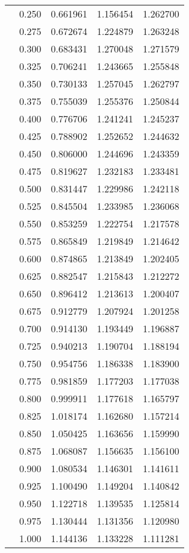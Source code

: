 \begin{tabular}{llrrr}
         & 0.250 &   0.661961 &   1.156454 &   1.262700 \\
         & 0.275 &   0.672674 &   1.224879 &   1.263248 \\
         & 0.300 &   0.683431 &   1.270048 &   1.271579 \\
         & 0.325 &   0.706241 &   1.243665 &   1.255848 \\
         & 0.350 &   0.730133 &   1.257045 &   1.262797 \\
         & 0.375 &   0.755039 &   1.255376 &   1.250844 \\
         & 0.400 &   0.776706 &   1.241241 &   1.245237 \\
         & 0.425 &   0.788902 &   1.252652 &   1.244632 \\
         & 0.450 &   0.806000 &   1.244696 &   1.243359 \\
         & 0.475 &   0.819627 &   1.232183 &   1.233481 \\
         & 0.500 &   0.831447 &   1.229986 &   1.242118 \\
         & 0.525 &   0.845504 &   1.233985 &   1.236068 \\
         & 0.550 &   0.853259 &   1.222754 &   1.217578 \\
         & 0.575 &   0.865849 &   1.219849 &   1.214642 \\
         & 0.600 &   0.874865 &   1.213849 &   1.202405 \\
         & 0.625 &   0.882547 &   1.215843 &   1.212272 \\
         & 0.650 &   0.896412 &   1.213613 &   1.200407 \\
         & 0.675 &   0.912779 &   1.207924 &   1.201258 \\
         & 0.700 &   0.914130 &   1.193449 &   1.196887 \\
         & 0.725 &   0.940213 &   1.190704 &   1.188194 \\
         & 0.750 &   0.954756 &   1.186338 &   1.183900 \\
         & 0.775 &   0.981859 &   1.177203 &   1.177038 \\
         & 0.800 &   0.999911 &   1.177618 &   1.165797 \\
         & 0.825 &   1.018174 &   1.162680 &   1.157214 \\
         & 0.850 &   1.050425 &   1.163656 &   1.159990 \\
         & 0.875 &   1.068087 &   1.156635 &   1.156100 \\
         & 0.900 &   1.080534 &   1.146301 &   1.141611 \\
         & 0.925 &   1.100490 &   1.149204 &   1.140842 \\
         & 0.950 &   1.122718 &   1.139535 &   1.125814 \\
         & 0.975 &   1.130444 &   1.131356 &   1.120980 \\
         & 1.000 &   1.144136 &   1.133228 &   1.111281 \\
\bottomrule
\end{tabular}
